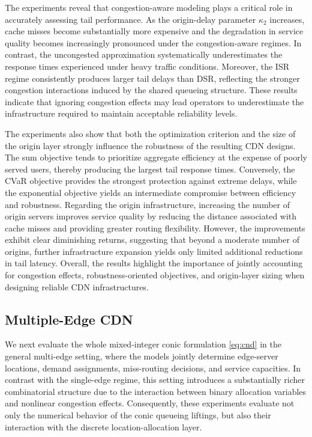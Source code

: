 \documentclass[a4paper,11pt,reqno]{amsart}
\begin{document}
The experiments reveal that congestion-aware modeling plays a critical role in accurately assessing tail performance. As the origin-delay parameter $\kappa_2$ increases, cache misses become substantially more expensive and the degradation in service quality becomes increasingly pronounced under the congestion-aware regimes. In contrast, the uncongested approximation systematically underestimates the response times experienced under heavy traffic conditions. Moreover, the ISR regime consistently produces larger tail delays than DSR, reflecting the stronger congestion interactions induced by the shared queueing structure. These results indicate that ignoring congestion effects may lead operators to underestimate the infrastructure required to maintain acceptable reliability levels.

The experiments also show that both the optimization criterion and the size of the origin layer strongly influence the robustness of the resulting CDN designs. The sum objective tends to prioritize aggregate efficiency at the expense of poorly served users, thereby producing the largest tail response times. Conversely, the CVaR objective provides the strongest protection against extreme delays, while the exponential objective yields an intermediate compromise between efficiency and robustness. Regarding the origin infrastructure, increasing the number of origin servers improves service quality by reducing the distance associated with cache misses and providing greater routing flexibility. However, the improvements exhibit clear diminishing returns, suggesting that beyond a moderate number of origins, further infrastructure expansion yields only limited additional reductions in tail latency. Overall, the results highlight the importance of jointly accounting for congestion effects, robustness-oriented objectives, and origin-layer sizing when designing reliable CDN infrastructures.

\subsection{Multiple-Edge CDN}

We next evaluate the whole mixed-integer conic formulation \eqref{eq:cnd} in the general multi-edge setting, where the models jointly determine edge-server locations, demand assignments, miss-routing decisions, and service capacities. In contrast with the single-edge regime, this setting introduces a substantially richer combinatorial structure due to the interaction between binary allocation variables and nonlinear congestion effects. Consequently, these experiments evaluate not only the numerical behavior of the conic queueing liftings, but also their interaction with the discrete location-allocation layer.
\end{document}
